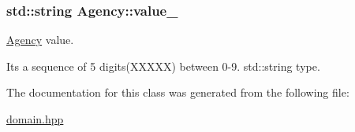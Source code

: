 \subsubsection[{\texorpdfstring{value\+\_\+}{value_}}]{\setlength{\rightskip}{0pt plus 5cm}std\+::string Agency\+::value\+\_\+\hspace{0.3cm}{\ttfamily [private]}}\hypertarget{classAgency_ad76c5be8c5d2b5ed3323a749f30801c6}{}\label{classAgency_ad76c5be8c5d2b5ed3323a749f30801c6}


\hyperlink{classAgency}{Agency} value. 

It\textquotesingle{}s a sequence of 5 digits(\+X\+X\+X\+X\+X) between 0-\/9. std\+::string type. 

The documentation for this class was generated from the following file\+:\begin{DoxyCompactItemize}
\item 
\hyperlink{domain_8hpp}{domain.\+hpp}\end{DoxyCompactItemize}
